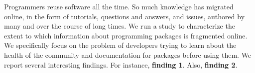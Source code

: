 Programmers reuse software all the time.
So much knowledge has migrated online, in the form of tutorials, questions and answers, and issues, authored by many and over the course of long times.
We run a study to characterize the extent to which information about programming packages is fragmented online.
We specifically focus on the problem of developers trying to learn about the health of the community and documentation for packages before using them.
We report several interesting findings.
For instance, \textbf{finding 1}.
Also, \textbf{finding 2}.
